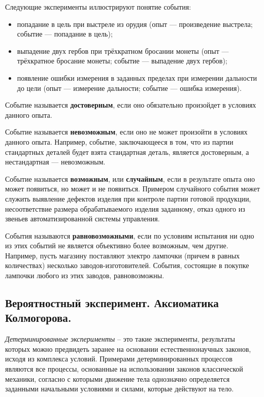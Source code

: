 \begin{exmp}[События]
	Следующие эксперименты иллюстрируют понятие события:
	\begin{itemize}
		\item попадание в цель при выстреле из орудия (опыт — произведение выстрела; событие — попадание в цель);
		\item выпадение двух гербов при трёхкратном бросании монеты (опыт — трёхкратное бросание монеты; событие — выпадение двух гербов);
		\item появление ошибки измерения в заданных пределах при измерении дальности до цели (опыт — измерение дальности; событие — ошибка измерения).
	\end{itemize}
\end{exmp}

Событие называется \textbf{достоверным}, если оно обязательно произойдет в условиях данного опыта.

Событие называется \textbf{невозможным}, если оно не может произойти в условиях данного опыта. Например, событие, заключающееся в том, что из партии стандартных деталей будет взята стандартная деталь, является достоверным, а нестандартная — невозможным.

Событие называется \textbf{возможным}, или \textbf{случайным}, если в результате опыта оно может появиться, но может и не появиться. Примером случайного события может служить выявление дефектов изделия при контроле партии готовой продукции, несоответствие размера обрабатываемого изделия заданному, отказ одного из звеньев автоматизированной системы управления.

События называются \textbf{равновозможными}, если по условиям испытания ни одно из этих событий не является объективно более возможным, чем другие. Например, пусть магазину поставляют электро лампочки (причем в равных количествах) несколько заводов-изготовителей. События, состоящие в покупке лампочки любого из этих заводов, равновозможны.

\subsection{Вероятностный эксперимент. Аксиоматика Колмогорова.}

\begin{definition}
	\textit{Детерминированные эксперименты} – это такие эксперименты, результаты которых можно предвидеть заранее на основании естественнонаучных законов, исходя из комплекса условий. Примерами детерминированных процессов являются все процессы, основанные на использовании законов классической механики, согласно с которыми движение тела однозначно определяется заданными начальными условиями и силами, которые действуют на тело.
\end{definition}

